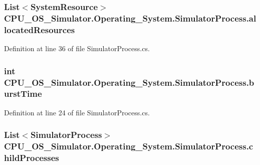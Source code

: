 \subsubsection[{allocated\+Resources}]{\setlength{\rightskip}{0pt plus 5cm}List$<${\bf System\+Resource}$>$ C\+P\+U\+\_\+\+O\+S\+\_\+\+Simulator.\+Operating\+\_\+\+System.\+Simulator\+Process.\+allocated\+Resources\hspace{0.3cm}{\ttfamily [private]}}\label{class_c_p_u___o_s___simulator_1_1_operating___system_1_1_simulator_process_af493fe44d2e40001e847ce762f1fac67}


Definition at line 36 of file Simulator\+Process.\+cs.

\hypertarget{class_c_p_u___o_s___simulator_1_1_operating___system_1_1_simulator_process_aaa8160807178efd2cb70364dc48a8c70}{}
\subsubsection[{burst\+Time}]{\setlength{\rightskip}{0pt plus 5cm}int C\+P\+U\+\_\+\+O\+S\+\_\+\+Simulator.\+Operating\+\_\+\+System.\+Simulator\+Process.\+burst\+Time\hspace{0.3cm}{\ttfamily [private]}}\label{class_c_p_u___o_s___simulator_1_1_operating___system_1_1_simulator_process_aaa8160807178efd2cb70364dc48a8c70}


Definition at line 24 of file Simulator\+Process.\+cs.

\hypertarget{class_c_p_u___o_s___simulator_1_1_operating___system_1_1_simulator_process_a72edfc38a41a74a935147ea8039ea49c}{}
\subsubsection[{child\+Processes}]{\setlength{\rightskip}{0pt plus 5cm}List$<${\bf Simulator\+Process}$>$ C\+P\+U\+\_\+\+O\+S\+\_\+\+Simulator.\+Operating\+\_\+\+System.\+Simulator\+Process.\+child\+Processes\hspace{0.3cm}{\ttfamily [private]}}\label{class_c_p_u___o_s___simulator_1_1_operating___system_1_1_simulator_process_a72edfc38a41a74a935147ea8039ea49c}


